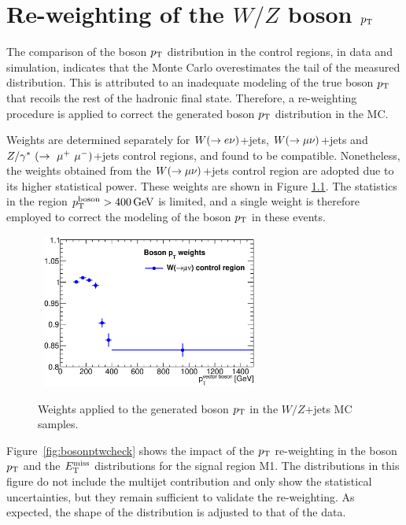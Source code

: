 \chapter{Re-weighting of the $W/Z$ boson $p_{\mathrm{T}}$}
    \label{app:BosonPtReweight}

The comparison of the boson $p_{\mathrm{T}}$ distribution in the control regions, in data and simulation, indicates that the Monte Carlo overestimates the tail of the measured distribution.
This is attributed to an inadequate modeling of the true boson $p_{\mathrm{T}}$ that recoils the rest of the hadronic final state.
Therefore, a re-weighting procedure is applied to correct the generated boson $p_{\mathrm{T}}$ distribution in the MC.

Weights are determined separately for $W(\rightarrow e \nu)$+jets, $W(\rightarrow \mu \nu)$+jets and $Z/\gamma^*~(\rightarrow~\mu^+~\mu^-)$+jets control regions, and found to be compatible.
Nonetheless, the weights obtained from the $W(\rightarrow \mu \nu)$+jets control region are adopted due to its higher statistical power.
These weights are shown in Figure \ref{fig:BosonPtWeights}.
The statistics in the region $\pt^{\text{boson}} > \unit[400]{GeV}$ is limited, and a single weight is therefore employed to correct the modeling of the boson $p_{\mathrm{T}}$ in these events.

\begin{figure}[!ht]
  \begin{center}
    \mbox{
      \includegraphics[width=0.635\textwidth]{Appendix_BosonPtReweight/Figures/BosonPtWeights.eps}
    }
  \end{center}
  \caption{Weights applied to the generated boson $p_{\mathrm{T}}$ in the $W/Z$+jets MC samples.}
  \label{fig:BosonPtWeights}
\end{figure}

Figure~\ref{fig:bosonptwcheck} shows the impact of the $p_{\mathrm{T}}$ re-weighting in the boson $p_{\mathrm{T}}$ and the $E_{\mathrm{T}}^{\mathrm{miss}}$ distributions for the signal region M1.
The distributions in this figure do not include the multijet contribution and only show the statistical uncertainties, but they remain sufficient to validate the re-weighting.
As expected, the shape of the distribution is adjusted to that of the data.

